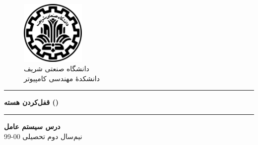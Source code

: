 \begin{center}
	\null
	\vspace{1cm}
\begin{figure}[H]
	\centering
	\includegraphics[width=0.275\textwidth]{sharif-logo-fa.png}
	\caption*{دانشگاه صنعتی شریف\\
		\large{
	دانشکدهٔ مهندسی کامپیوتر}
}
\end{figure}
\vspace{1 cm}
\hrule
\vspace{.5cm}
\fontsize{28}{28}\textbf{
قفل‌‌کردن هسته ()}
\\
\vspace{.5cm}
\hrule
\vspace{1cm}
\fontsize{16}{16}\textbf{
درس سیستم عامل\\
}
\vspace{1.5cm}
\normalfont
\vspace{2 cm}
\fontsize{13}{13}
 \vspace{1 cm}
\vspace{0.5 cm}
\fontsize{14}{14}{\selectfont
	\makecell{\teamMemOne\\ \stdIdOne}
}
\normalsize
\vfill{نیم‌سال دوم تحصیلی 00-99}
\end{center}
\thispagestyle{empty}